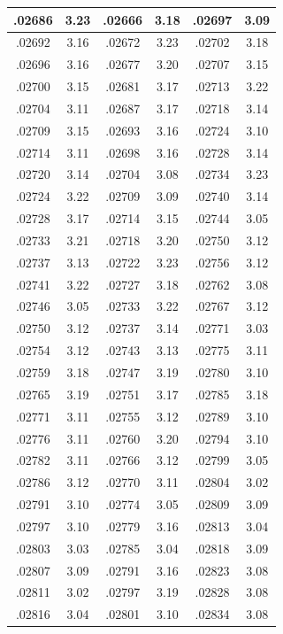 \documentclass[10pt,twoside]{report}
\begin{document}
\begin{appendices}
\begin{longtable}{|c|c||c|c||c|c|}
.02686 & 3.23 & .02666 & 3.18 & .02697 & 3.09\\\hline
.02692 & 3.16 & .02672 & 3.23 & .02702 & 3.18\\\hline
.02696 & 3.16 & .02677 & 3.20 & .02707 & 3.15\\\hline
.02700 & 3.15 & .02681 & 3.17 & .02713 & 3.22\\\hline
.02704 & 3.11 & .02687 & 3.17 & .02718 & 3.14\\\hline
.02709 & 3.15 & .02693 & 3.16 & .02724 & 3.10\\\hline
.02714 & 3.11 & .02698 & 3.16 & .02728 & 3.14\\\hline
.02720 & 3.14 & .02704 & 3.08 & .02734 & 3.23\\\hline
.02724 & 3.22 & .02709 & 3.09 & .02740 & 3.14\\\hline
.02728 & 3.17 & .02714 & 3.15 & .02744 & 3.05\\\hline
.02733 & 3.21 & .02718 & 3.20 & .02750 & 3.12\\\hline
.02737 & 3.13 & .02722 & 3.23 & .02756 & 3.12\\\hline
.02741 & 3.22 & .02727 & 3.18 & .02762 & 3.08\\\hline
.02746 & 3.05 & .02733 & 3.22 & .02767 & 3.12\\\hline
.02750 & 3.12 & .02737 & 3.14 & .02771 & 3.03\\\hline
.02754 & 3.12 & .02743 & 3.13 & .02775 & 3.11\\\hline
.02759 & 3.18 & .02747 & 3.19 & .02780 & 3.10\\\hline
.02765 & 3.19 & .02751 & 3.17 & .02785 & 3.18\\\hline
.02771 & 3.11 & .02755 & 3.12 & .02789 & 3.10\\\hline
.02776 & 3.11 & .02760 & 3.20 & .02794 & 3.10\\\hline
.02782 & 3.11 & .02766 & 3.12 & .02799 & 3.05\\\hline
.02786 & 3.12 & .02770 & 3.11 & .02804 & 3.02\\\hline
.02791 & 3.10 & .02774 & 3.05 & .02809 & 3.09\\\hline
.02797 & 3.10 & .02779 & 3.16 & .02813 & 3.04\\\hline
.02803 & 3.03 & .02785 & 3.04 & .02818 & 3.09\\\hline
.02807 & 3.09 & .02791 & 3.16 & .02823 & 3.08\\\hline
.02811 & 3.02 & .02797 & 3.19 & .02828 & 3.08\\\hline
.02816 & 3.04 & .02801 & 3.10 & .02834 & 3.08\\\hline

\end{longtable}
\end{appendices}
\end{document}
